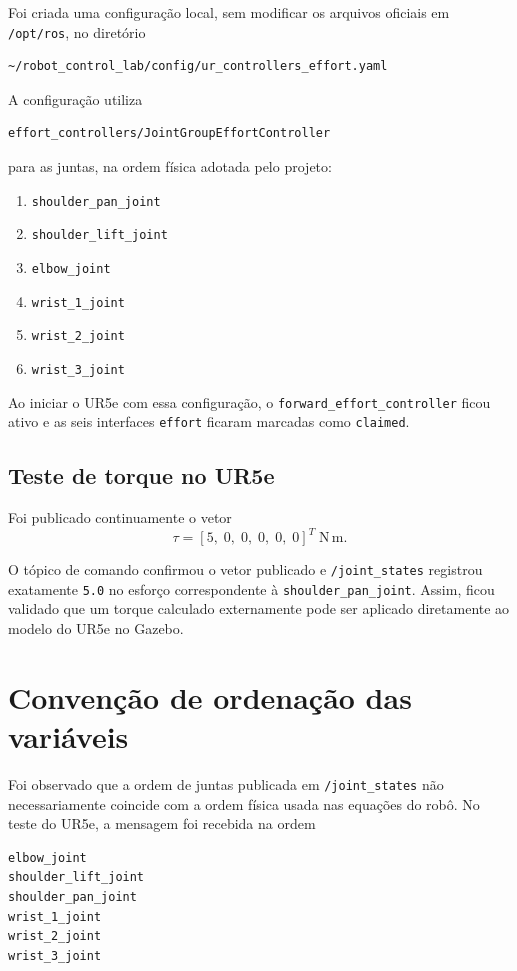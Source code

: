\documentclass[11pt,a4paper]{article}
\begin{document}
Foi criada uma configuração local, sem modificar os arquivos oficiais em \texttt{/opt/ros}, no diretório
\begin{lstlisting}
~/robot_control_lab/config/ur_controllers_effort.yaml
\end{lstlisting}

A configuração utiliza
\begin{lstlisting}
effort_controllers/JointGroupEffortController
\end{lstlisting}
para as juntas, na ordem física adotada pelo projeto:
\begin{enumerate}
  \item \texttt{shoulder\_pan\_joint}
  \item \texttt{shoulder\_lift\_joint}
  \item \texttt{elbow\_joint}
  \item \texttt{wrist\_1\_joint}
  \item \texttt{wrist\_2\_joint}
  \item \texttt{wrist\_3\_joint}
\end{enumerate}

Ao iniciar o UR5e com essa configuração, o \texttt{forward\_effort\_controller} ficou ativo e as seis interfaces \texttt{effort} ficaram marcadas como \texttt{claimed}.

\subsection{Teste de torque no UR5e}

Foi publicado continuamente o vetor
\begin{equation}
\tau = [5,\;0,\;0,\;0,\;0,\;0]^T\;\mathrm{N\,m}.
\end{equation}

O tópico de comando confirmou o vetor publicado e \texttt{/joint\_states} registrou exatamente \texttt{5.0} no esforço correspondente à \texttt{shoulder\_pan\_joint}. Assim, ficou validado que um torque calculado externamente pode ser aplicado diretamente ao modelo do UR5e no Gazebo.

\section{Convenção de ordenação das variáveis}

Foi observado que a ordem de juntas publicada em \texttt{/joint\_states} não necessariamente coincide com a ordem física usada nas equações do robô. No teste do UR5e, a mensagem foi recebida na ordem
\begin{lstlisting}
elbow_joint
shoulder_lift_joint
shoulder_pan_joint
wrist_1_joint
wrist_2_joint
wrist_3_joint
\end{lstlisting}
\end{document}
